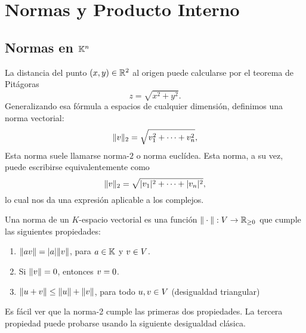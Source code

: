 \chapter{Normas y Producto Interno}
\setcounter{equation}{0}

\section{Normas en $\mathbb K^n$}

La distancia del punto $(x,y)\in \mathbb R^2$  al origen puede calcularse por el teorema de Pitágoras
$$
z = \sqrt{x^2 + y^2}.
$$
Generalizando esa fórmula a espacios de cualquier dimensión, definimos una norma vectorial:
$$
\|\vb\|_2 = \sqrt{v_1^2 + \dots + v_n^2},
$$
Esta norma suele llamarse norma-$2$ o norma euclídea. Esta norma,  a su vez, puede escribirse equivalentemente como
$$
\|\vb\|_2 = \sqrt{|v_1|^2 + \dots + |v_n|^2},
$$
lo cual nos da una expresión aplicable a los complejos.

\tccdefi
\begin{definicion}
Una norma de un $K$-espacio vectorial es una función $\| \cdot \| : V \rightarrow \mathbb R_{\ge 0}$ que cumple las siguientes propiedades:
\begin{enumerate}
\item $\|a \vb\| = |a| \|\vb\|$, para $a \in \mathbb K$ y $\vb \in V$.
\item Si $\|\vb\| = 0$, entonces $\vb = 0$.
\item $\|\ub + \vb\| \le \|\ub\| + \|\vb\|$, para todo $\ub, \vb \in V$ \qquad (desigualdad triangular)
\end{enumerate}
\end{definicion}
\etcc
Es fácil ver que la norma-2 cumple las primeras dos propiedades.  La tercera propiedad puede probarse usando la siguiente desigualdad clásica.

